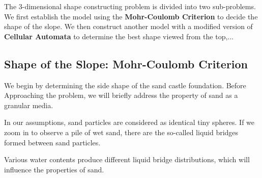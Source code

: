 \documentclass[12pt]{article}
\begin{document}
\par
The 3-dimensional shape constructing problem is divided into two sub-problems. We first establish the model using the \textbf{Mohr-Coulomb Criterion} to decide the shape of the slope. We then construct another model with a modified version of \textbf{Cellular Automata} to determine the best shape viewed from the top,...

\subsection{Shape of the Slope: Mohr-Coulomb Criterion}


We begin by determining the side shape of the sand castle foundation. Before Approaching the problem, we will briefly address the property of sand as a granular media.
\par
In our assumptions, sand particles are considered as identical tiny spheres. If we zoom in to observe a pile of wet sand, there are the so-called liquid bridges formed between sand particles.
\par
Various water contents produce different liquid bridge distributions, which will influence the properties of sand.
\end{document}
